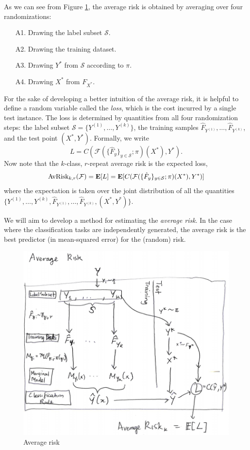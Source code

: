 \documentclass[12pt]{article}
\begin{document}
As we can see from Figure \ref{fig:average_risk}, the average risk is obtained by averaging
over four randomizations:
\begin{enumerate}
\item[A1.] Drawing the label subset $\mathcal{S}$.
\item[A2.] Drawing the training dataset.
\item[A3.] Drawing $Y^*$ from $\mathcal{S}$ according to $\pi$.
\item[A4.] Drawing $X^*$ from $F_{X^*}$.
\end{enumerate}

For the sake of developing a better intuition of the average risk, it
is helpful to define a random variable called the \emph{loss}, which
is the cost incurred by a single test instance.  The loss is
determined by quantities from all four randomization steps: the label
subset $\mathcal{S} = \{Y^{(1)},\hdots, Y^{(k)}\}$, the training samples
$\hat{F}_{Y^{(1)}},\hdots, \hat{F}_{Y^{(k)}}$, and the test point $(X^*, Y^*)$.
Formally, we write
\[
L = C(\mathcal{F}(\{\hat{F}_y\}_{y \in \mathcal{S}}; \pi)(X^*), Y^*).
\]
Now note that the $k$-class, $r$-repeat average risk is the expected loss,
\begin{equation}\label{eq:avrisk_EL}
\text{AvRisk}_{k, r}(\mathcal{F}) = \textbf{E}[L] = \textbf{E}[C(\mathcal{F}(\{\hat{F}_y\}_{y \in \mathcal{S}}; \pi)(X^*), Y^*)]
\end{equation}
where the expectation is taken over the joint distribution of all the
quantities $\{Y^{(1)},\hdots,
Y^{(k)}, \hat{F}_{Y^{(1)}},\hdots, \hat{F}_{Y^{(k)}}, (X^*, Y^*)\}$.

We will aim to develop a method for estimating the \emph{average
risk}.  In the case where the classification tasks are independently
generated, the average risk is the best predictor (in mean-squared
error) for the (random) risk.


\begin{figure}[h]
\centering
\includegraphics[scale = 0.4]{extrapolation_figures/average_risk.png}
\caption{Average risk}\label{fig:average_risk}
\end{figure}
\end{document}
